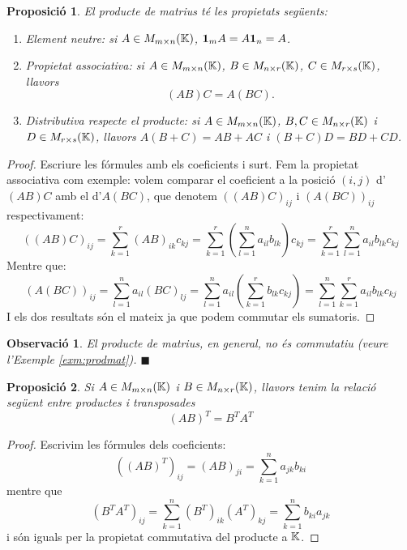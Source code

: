 \documentclass[
  11pt,
]{book}
\numberwithin{dummy}{section}
\theoremstyle{maincolornumbox}
\newtheorem{remarkT}{Observació}[chapter]
\theoremstyle{blacknumex}
\theoremstyle{blacknumbox}
\theoremstyle{maincolornum}
\newtheorem{propositionT}{Proposició}[chapter]
\newenvironment{proposition}{\begin{pBox}\begin{propositionT}}{\end{propositionT}\end{pBox}}
\newenvironment{remark}{\begin{remarkT}}{\hfill{\tiny\ensuremath{\blacksquare}}\end{remarkT}}
\newlength\esp
\begin{document}
\begin{proposition}

El producte de matrius té les propietats següents:

\begin{enumerate}
\def\labelenumi{\arabic{enumi}.}
\item
  Element neutre: si \(A \in M_{m\times n}(\mathbb{K})\), \(\mathbf{1}_m A = A \mathbf{1}_n = A\).
\item
  Propietat associativa: si \(A \in M_{m\times n}(\mathbb{K})\),
  \(B \in M_{n\times r}(\mathbb{K})\), \(C \in M_{r\times s}(\mathbb{K})\), llavors
  \[(AB)C=A(BC).\]
\item
  Distributiva respecte el producte: si \(A \in M_{m\times n}(\mathbb{K})\),
  \(B, C \in M_{n\times r}(\mathbb{K})\) i \(D \in M_{r\times s}(\mathbb{K})\), llavors
  \(A(B+C)=AB+AC\) i \((B+C)D=BD+CD\).
\end{enumerate}

\end{proposition}

\begin{proof}
Escriure les fórmules amb els coeficients i surt. Fem la
propietat associativa com exemple: volem comparar el coeficient a la
posició \((i,j)\) d'\((AB)C\) amb el d'\(A(BC)\), que denotem \(((AB)C)_{ij}\) i
\((A(BC))_{ij}\) respectivament:
\[((AB)C)_{ij}=\sum_{k=1}^r(AB)_{ik}c_{kj}=\sum_{k=1}^r(\sum_{l=1}^na_{il}b_{lk})c_{kj}=\sum_{k=1}^r\sum_{l=1}^na_{il}b_{lk}c_{kj}\]
Mentre que:
\[(A(BC))_{ij}=\sum_{l=1}^na_{il}(BC)_{lj}=\sum_{l=1}^na_{il}(\sum_{k=1}^rb_{lk}c_{kj})=\sum_{l=1}^n\sum_{k=1}^ra_{il}b_{lk}c_{kj}\]
I els dos resultats són el mateix ja que podem commutar els sumatoris.
\end{proof}

\begin{remark}
El producte de matrius, en general, no és commutatiu (veure l'Exemple
\ref{exm:prodmat}).
\end{remark}

\begin{proposition}
Si \(A\in M_{m\times n}(\mathbb{K})\) i \(B\in M_{n\times r}(\mathbb{K})\), llavors tenim la
relació següent entre productes i transposades \[(AB)^T=B^T A^T\]
\end{proposition}

\begin{proof}
Escrivim les fórmules dels coeficients:
\[((AB)^T)_{ij}=(AB)_{ji}=\sum_{k=1}^n a_{jk}b_{ki}\] mentre que
\[(B^TA^T)_{ij}=\sum_{k=1}^n (B^T)_{ik}(A^T)_{kj}=\sum_{k=1}^n b_{ki}a_{jk}\]
i són iguals per la propietat commutativa del producte a \(\mathbb{K}\).
\end{proof}
\end{document}
